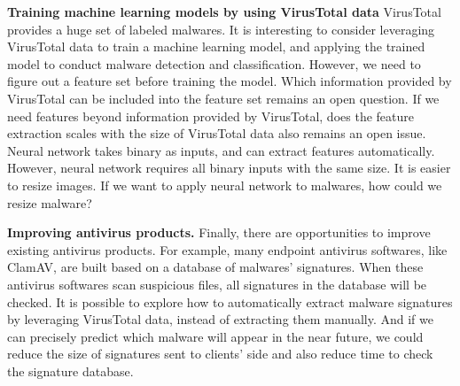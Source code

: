 {\bf Training machine learning models by using VirusTotal data}
VirusTotal provides a huge set of labeled malwares. 
It is interesting to consider leveraging VirusTotal data to train a machine learning model, 
and applying the trained model to conduct malware detection and classification. 
However, we need to figure out a feature set before training the model. 
Which information provided by VirusTotal can be included into the feature set remains an open question. 
If we need features beyond information provided by VirusTotal, does the feature extraction scales with the size of VirusTotal data also remains an open issue. 
Neural network takes binary as inputs, and can extract features automatically. 
However, neural network requires all binary inputs with the same size. 
It is easier to resize images. If we want to apply neural network to malwares, how could we resize malware? 

{\bf Improving antivirus products.} 
Finally, there are opportunities to improve existing antivirus products. 
For example, many endpoint antivirus softwares, like ClamAV, are built based on a database of malwares' signatures. 
When these antivirus softwares scan suspicious files, all signatures in the database will be checked. 
It is possible to explore how to automatically extract malware signatures by leveraging VirusTotal data, instead of extracting them manually.
And if we can precisely predict which malware will appear in the near future, 
we could reduce the size of signatures sent to clients' side and also reduce time to check the signature database. 



